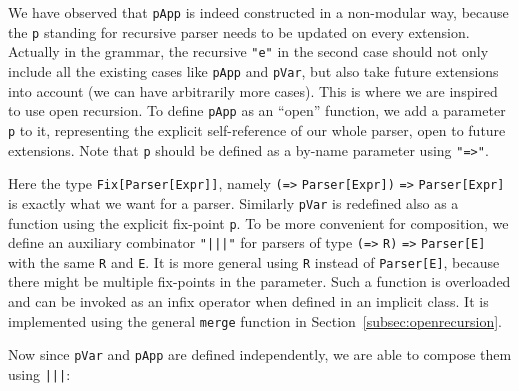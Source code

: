 
We have observed that \lstinline{pApp} is indeed constructed in a
non-modular way, because the \lstinline{p} standing for recursive
parser needs to be updated on every extension. Actually in the
grammar, the recursive \lstinline{"e"} in the second case should not
only include all the existing cases like \lstinline{pApp} and
\lstinline{pVar}, but also take future extensions into account (we can
have arbitrarily more cases). This is where we are inspired to use
open recursion. To define \lstinline{pApp} as an ``open'' function, we
add a parameter \lstinline{p} to it, representing the explicit
self-reference of our whole parser, open to future extensions. Note
that \lstinline{p} should be defined as a by-name parameter using
\lstinline{"=>"}.


Here the type \lstinline{Fix[Parser[Expr]]}, namely \lstinline{(=>} \lstinline{Parser[Expr])} \lstinline{=>} \lstinline{Parser[Expr]} is exactly what we want for a parser. Similarly \lstinline{pVar} is redefined also as a function using the explicit fix-point \lstinline{p}. To be more convenient for composition, we define an auxiliary combinator \lstinline{"|||"} for parsers of type \lstinline{(=>} \lstinline{R)} \lstinline{=>} \lstinline{Parser[E]} with the same \lstinline{R} and \lstinline{E}. It is more general using \lstinline{R} instead of \lstinline{Parser[E]}, because there might be multiple fix-points in the parameter. Such a function is overloaded and can be invoked as an infix operator when defined in an implicit class. It is implemented using the general \lstinline{merge} function in Section~\ref{subsec:openrecursion}.


Now since \lstinline{pVar} and \lstinline{pApp} are defined independently, we are able to compose them using \lstinline{|||}:

